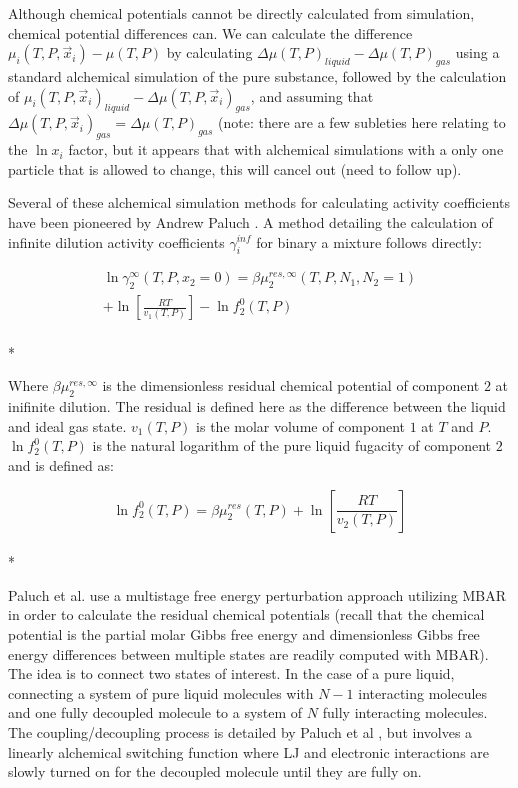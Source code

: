 \documentclass[aps,pre,twocolumn,nofootinbib,superscriptaddress,linenumbers,10pt, draft,tightenlines]{revtex4-1}
\begin{document}
Although chemical potentials cannot be directly calculated from
simulation, chemical potential differences can. We can calculate the
difference $\mu_i(T,P,\vec{x}_i) - \mu(T,P)$ by calculating $\Delta
\mu(T,P)_{liquid} - \Delta \mu(T,P)_{gas}$ using a standard alchemical
simulation of the pure substance, followed by the calculation of
$\mu_i(T,P,\vec{x}_i)_{liquid} - \Delta \mu(T,P,\vec{x}_i)_{gas}$, and
assuming that $\Delta \mu(T,P,\vec{x}_i)_{gas} = \Delta
\mu(T,P)_{gas}$ (note: there are a few subleties here relating to the
$\ln x_i$ factor, but it appears that with alchemical simulations with
a only one particle that is allowed to change, this will cancel out
(need to follow up).

Several of these alchemical simulation methods for calculating activity coefficients have been pioneered by Andrew Paluch \cite{paluch1}. A method detailing the calculation of infinite dilution activity coefficients $\gamma_i^{inf}$ for binary a mixture follows directly:

\begin{multline}
\ln\gamma_2^{\infty}\left(T,P,x_2 = 0\right) = \beta \mu_2^{res,\infty}\left(T,P,N_1,N_2 = 1\right) \\ + \ln\left[\frac{R T}{v_1\left(T,P\right)}\right] - \ln f_2^0\left(T,P\right)
\end{multline}\\*

Where $\beta\mu_2^{res,\infty}$ is the dimensionless residual chemical potential of component $2$ at inifinite dilution. The residual is defined here as the difference between the liquid and ideal gas state. $v_1\left(T,P\right)$ is the molar volume of component $1$ at $T$ and $P$. $\ln f_2^0\left(T,P\right)$ is the natural logarithm of the pure liquid fugacity of component $2$ and is defined as:

\begin{equation}\ln f_2^0\left(T,P\right) = \beta\mu_2^{res}\left(T,P\right) + \ln\left[\frac{R T}{v_2\left(T,P\right)}\right]\end{equation}\\*

Paluch et al. use a multistage free energy perturbation approach utilizing MBAR in order to calculate the residual chemical potentials (recall that the chemical potential is the partial molar Gibbs free energy and dimensionless Gibbs free energy differences between multiple states are readily computed with MBAR). The idea is to connect two states of interest. In the case of a pure liquid, connecting a system of pure liquid molecules with $N - 1$ interacting molecules and one fully decoupled molecule to a system of $N$ fully interacting molecules. The coupling/decoupling process is detailed by Paluch et al \cite{paluch0}, but involves a linearly alchemical switching function where LJ and electronic interactions are slowly turned on for the decoupled molecule until they are fully on.     
\end{document}

